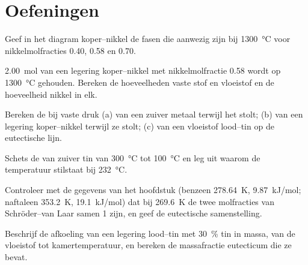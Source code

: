 \section{Oefeningen}

\begin{exercise}[$\star$]\label{exo:b2:solid-liquid-diagrams:1}
Geef in het diagram koper--nikkel de fasen die aanwezig zijn bij
\qty{1300}{\degreeCelsius} voor nikkelmolfracties 0.40, 0.58 en 0.70.
\end{exercise}

\begin{exercise}[$\star$]\label{exo:b2:solid-liquid-diagrams:2}
\qty{2.00}{mol} van een legering koper--nikkel met nikkelmolfractie 0.58 wordt
op \qty{1300}{\degreeCelsius} gehouden. Bereken de hoeveelheden vaste stof en vloeistof en de
hoeveelheid nikkel in elk.
\end{exercise}

\begin{exercise}[$\star$]\label{exo:b2:solid-liquid-diagrams:3}
Bereken de  bij vaste druk (a) van een zuiver metaal terwijl het stolt;
(b) van een legering koper--nikkel terwijl ze stolt; (c) van een vloeistof lood--tin op de
eutectische lijn.
\end{exercise}

\begin{exercise}[$\star$]\label{exo:b2:solid-liquid-diagrams:4}
Schets de  van zuiver tin van \qty{300}{\degreeCelsius} tot
\qty{100}{\degreeCelsius} en leg uit waarom de temperatuur stilstaat bij
\qty{232}{\degreeCelsius}.
\end{exercise}

\begin{exercise}[$\star\star$]\label{exo:b2:solid-liquid-diagrams:5}
Controleer met de gegevens van het hoofdstuk (benzeen \qty{278.64}{K}, \qty{9.87}{kJ/mol};
naftaleen \qty{353.2}{K}, \qty{19.1}{kJ/mol}) dat bij
\qty{269.6}{K} de twee molfracties van Schröder--van Laar samen 1 zijn, en geef
de eutectische samenstelling.
\end{exercise}

\begin{exercise}[$\star\star$]\label{exo:b2:solid-liquid-diagrams:6}
Beschrijf de afkoeling van een legering lood--tin met 30~\% tin in massa, van de vloeistof
tot kamertemperatuur, en bereken de massafractie eutecticum die ze bevat.
\end{exercise}

